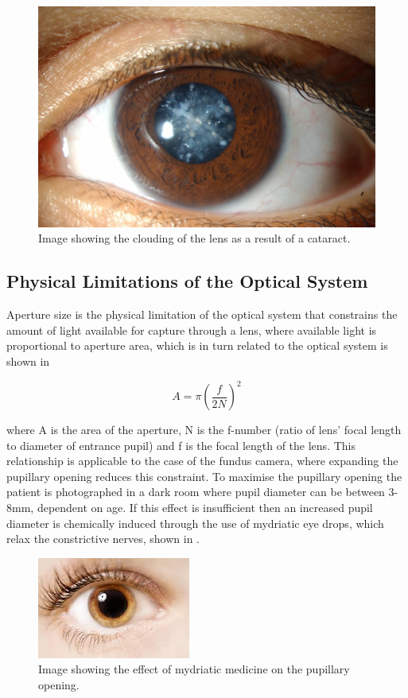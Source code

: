 \begin{figure}[H]
\centering
\includegraphics{figures/cataract}
\caption{Image showing the clouding of the lens as a result of a cataract.\cite{yannuzzi2011retinal}}
\label{fig:cat}
   \end{figure}

\subsection{Physical Limitations of the Optical System}

Aperture size is the physical limitation of the optical system that
constrains the amount of light available for capture through a lens,
where available light is proportional to aperture area, which is in
turn related to the optical system is shown in 

\begin{equation}
A = \pi\left({\frac{f}{2N}}\right)^2
\label{eq:optical_system}
\end{equation}

where A is the area of the aperture, N is the f-number (ratio of lens'
focal length to diameter of entrance pupil) and f is the focal length
of the lens. This relationship is applicable to the case of the fundus
camera, where expanding the pupillary opening reduces this constraint.
To maximise the pupillary opening the patient is photographed in a
dark room where pupil diameter can be between 3-8mm, dependent
on age. If this effect is insufficient then an increased pupil diameter is
chemically induced through the use of mydriatic eye drops, which relax
the constrictive nerves, shown in .

\begin{figure}[H]
\centering
\includegraphics{figures/mydriasis}
\caption{Image showing the effect of mydriatic medicine on the pupillary opening.\cite{yannuzzi2011retinal}}
\label{fig:myd}
   \end{figure}

